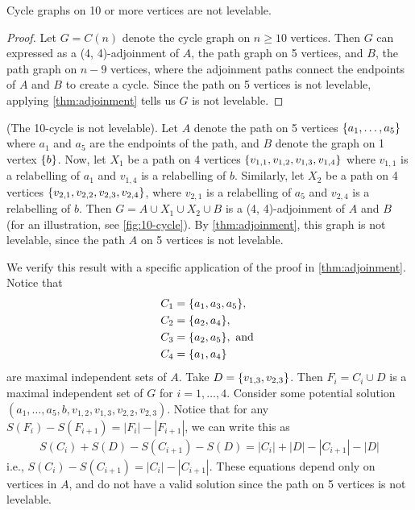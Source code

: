 \begin{corollary}
Cycle graphs on 10 or more vertices are not levelable.
\end{corollary}
\begin{proof}
Let $G = C(n)$ denote the cycle graph on $n \geq 10$ vertices. Then $G$ can expressed as a (4, 4)-adjoinment of $A$, the path graph on 5 vertices, and $B$, the path graph on $n-9$ vertices, where the adjoinment paths connect the endpoints of $A$ and $B$ to create a cycle. Since the path on 5 vertices is not levelable, applying \autoref{thm:adjoinment} tells us $G$ is not levelable.
\end{proof}

\begin{example} (The 10-cycle is not levelable). \label{ex:10-cycle}
Let $A$ denote the path on 5 vertices $\{ a_1, \dots, a_5 \}$ where $a_1$ and $a_5$ are the endpoints of the path, and $B$ denote the graph on 1 vertex $\{ b \}$. Now, let $X_1$ be a path on 4 vertices $\{ v_{1, 1}, v_{1, 2}, v_{1,3}, v_{1,4} \}$ 
where $v_{1,1}$ is a relabelling of $a_1$ and $v_{1,4}$ is a relabelling of $b$. Similarly, let $X_2$ be a path on 4 vertices $\{ v_{2, 1}, v_{2, 2}, v_{2, 3}, v_{2, 4} \}$, where $v_{2, 1}$ is a relabelling of $a_5$ and $v_{2, 4}$ is a relabelling of $b$. Then $G = A\cup X_1 \cup X_2 \cup B$ is a (4, 4)-adjoinment of $A$ and $B$ (for an illustration, see \autoref{fig:10-cycle}). By \autoref{thm:adjoinment}, this graph is not levelable, since the path $A$ on 5 vertices is not levelable.

We verify this result with a specific application of the proof in \autoref{thm:adjoinment}. Notice that
\begin{equation}
\begin{aligned}
&C_1 = \{ a_1, a_3, a_5 \}, \\
&C_2 = \{ a_2, a_4 \}, \\
&C_3 = \{ a_2, a_5 \}, \textrm{ and }\\
&C_4 = \{ a_1, a_4 \}
\end{aligned}
\end{equation}
are maximal independent sets of $A$. Take $D = \{ v_{1,3}, v_{2,3} \}$. Then $F_i = C_i \cup D$ is a maximal independent set of $G$ for $i = 1, \dots, 4$. Consider some potential solution $(a_1, \dots, a_5, b, v_{1,2}, v_{1,3}, v_{2, 2}, v_{2, 3})$. Notice that for any $S(F_i) - S(F_{i+1}) = |F_i| - |F_{i+1}|$, we can write this as 
\begin{equation}
\begin{aligned}
S(C_i) + S(D) - S(C_{i+1}) - S(D) = |C_i| + |D| - |C_{i+1}|- |D| 
\end{aligned}
\end{equation}
i.e., $S(C_i) - S(C_{i+1}) = |C_i| - |C_{i+1}|$. These equations depend only on vertices in $A$, and do not have a valid solution since the path on 5 vertices is not levelable.

\end{example}
